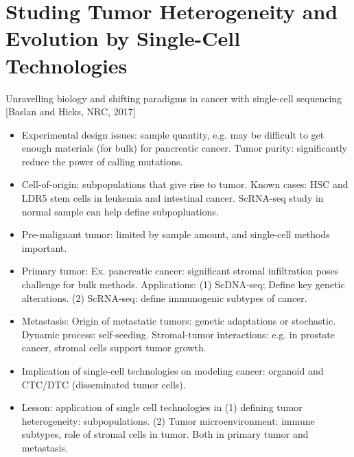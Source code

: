 \documentclass{report}
\begin{document}
\section{Studing Tumor Heterogeneity and Evolution by Single-Cell Technologies}

Unravelling biology and shifting paradigms in cancer with single-cell sequencing [Baslan and Hicks, NRC, 2017]
\begin{itemize}
	
	\item Experimental design issues: sample quantity, e.g. may be difficult to get enough materials (for bulk) for pancreatic cancer. Tumor purity: significantly reduce the power of calling mutations. 
	
	\item Cell-of-origin: subpopulations that give rise to tumor. Known cases: HSC and LDR5 stem cells in leukemia and intestinal cancer. ScRNA-seq study in normal sample can help define subpopluations. 
	
	\item Pre-malignant tumor: limited by sample amount, and single-cell methods important. 
	
	\item Primary tumor: Ex. pancreatic cancer: significant stromal infiltration poses challenge for bulk methods. Applications: (1) ScDNA-seq; Define key genetic alterations. (2) ScRNA-seq: define immunogenic subtypes of cancer. 
	
	\item Metastasis: Origin of metastatic tumors: genetic adaptations or stochastic. Dynamic process: self-seeding. Stromal-tumor interactions: e.g. in prostate cancer, stromal cells support tumor growth. 
	
	\item Implication of single-cell technologies on modeling cancer: organoid and CTC/DTC (disseminated tumor cells). 
	
	\item Lesson: application of single cell technologies in (1) defining tumor heterogeneity: subpopulations. (2) Tumor microenvironment: immune subtypes, role of stromal cells in tumor. Both in primary tumor and metastasis. 
\end{itemize}
\end{document}
